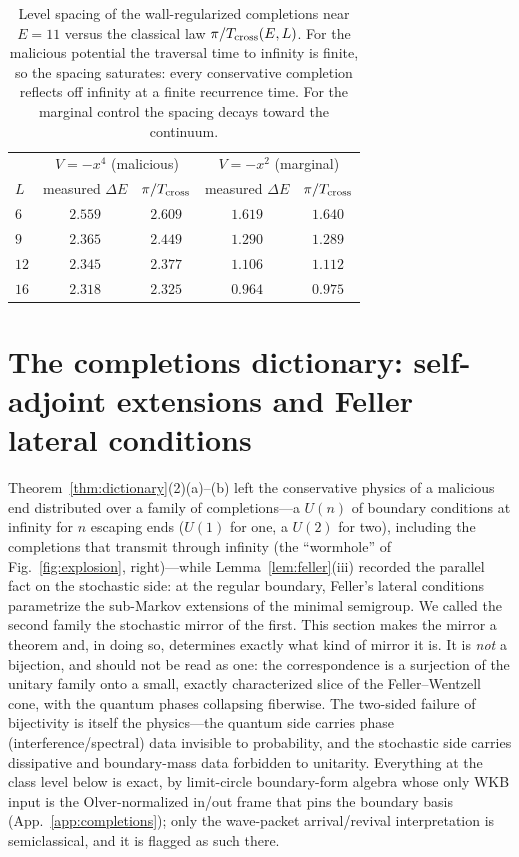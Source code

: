 \documentclass[11pt]{article}
\theoremstyle{definition}
\theoremstyle{remark}
\begin{document}
\begin{table}[t]
\centering
\begin{tabular}{lcccc}
\toprule
 & \multicolumn{2}{c}{$V=-x^{4}$ (malicious)} &
 \multicolumn{2}{c}{$V=-x^{2}$ (marginal)}\\
$L$ & measured $\Delta E$ & $\pi/T_{\rm cross}$ &
measured $\Delta E$ & $\pi/T_{\rm cross}$\\
\midrule
$6$  & $2.559$ & $2.609$ & $1.619$ & $1.640$\\
$9$  & $2.365$ & $2.449$ & $1.290$ & $1.289$\\
$12$ & $2.345$ & $2.377$ & $1.106$ & $1.112$\\
$16$ & $2.318$ & $2.325$ & $0.964$ & $0.975$\\
\bottomrule
\end{tabular}
\caption{Level spacing of the wall-regularized completions near $E=11$
versus the classical law $\pi/T_{\rm cross}(E,L)$. For the malicious
potential the traversal time to infinity is finite, so the spacing
saturates: every conservative completion reflects off infinity at a finite
recurrence time. For the marginal control the spacing decays toward the
continuum.}
\label{tab:spacing}
\end{table}

\section{The completions dictionary: self-adjoint extensions and Feller lateral conditions}
\label{sec:completions}

Theorem~\ref{thm:dictionary}(2)(a)--(b) left the conservative physics of a
malicious end distributed over a family of completions---a $U(n)$ of
boundary conditions at infinity for $n$ escaping ends ($U(1)$ for one, a $U(2)$ for two),
including the completions that transmit through infinity (the
``wormhole'' of Fig.~\ref{fig:explosion}, right)---while
Lemma~\ref{lem:feller}(iii) recorded the parallel fact on the stochastic
side: at the regular boundary, Feller's lateral conditions parametrize
the sub-Markov extensions of the minimal semigroup. We called the second
family the stochastic mirror of the first. This section makes the mirror
a theorem and, in doing so, determines exactly what kind of mirror it
is. It is \emph{not} a bijection, and should not be read as one: the
correspondence is a surjection of the unitary family onto a small,
exactly characterized slice of the Feller--Wentzell cone, with the
quantum phases collapsing fiberwise. The two-sided failure of
bijectivity is itself the physics---the quantum side carries phase
(interference/spectral) data invisible to probability, and the
stochastic side carries dissipative and boundary-mass data forbidden to
unitarity. Everything at the class level below is exact, by limit-circle
boundary-form algebra whose only WKB input is the Olver-normalized
in/out frame that pins the boundary basis (App.~\ref{app:completions});
only the wave-packet arrival/revival interpretation is semiclassical, and
it is flagged as such there.
\end{document}
